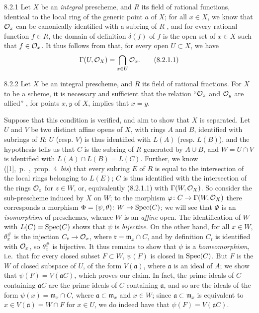\documentclass[../main.tex]{subfiles}
\begin{document}
\begin{env}{8.2.1}
    Let $X$ be an \emph{integral} prescheme, and $R$ its field of rational functions, identical to the local ring of the generic point $a$ of $X$; for all $x\in X$, we know that $\mathcal{O}_x$ can be canonically identified with a subring of $R$ , and for every rational function $f\in R$, the domain of definition $\delta(f)$ of $f$ is the open set of $x\in X$ such that $f\in\mathcal{O}_x$.
    It thus follows from  that, for every open $U\subset X$, we have
    \begin{equation*}
        \Gamma(U,\mathcal{O}_X) = \bigcap_{x\in U}\mathcal{O}_x.\tag{8.2.1.1}
    \end{equation*}
\end{env}

\begin{env}[Proposition]{8.2.2}
    Let $X$ be an integral prescheme, and $R$ its field of rational fractions.
    For $X$ to be a scheme, it is necessary and sufficient that the relation ``$\mathcal{O}_x$ and $\mathcal{O}_y$ are allied'' , for points $x,y$ of $X$, implies that $x=y$.
\end{env}

Suppose that this condition is verified, and aim to show that $X$ is separated.
Let $U$ and $V$ be two distinct affine opens of $X$, with rings $A$ and $B$, identified with subrings of $R$; $U$ (resp. $V$) is thus identified  with $L(A)$ (resp. $L(B)$), and the hypothesis tells us  that $C$ is the subring of $R$ generated by $A\cup B$, and $W=U\cap V$ is identified with $L(A)\cap L(B)=L(C)$.
Further, we know ([1],~p.~,~prop.~4~\emph{bis}) that every subring $E$ of $R$ is equal to the intersection of the local rings belonging to $L(E)$; $C$ is thus identified with the intersection of the rings $\mathcal{O}_z$ for $z\in W$, or, equivalently (8.2.1.1) with $\Gamma(W,\mathcal{O}_X)$.
So consider the sub-prescheme induced by $X$ on $W$; to the  morphism $\varphi\colon C\to\Gamma(W,\mathcal{O}_X)$ there corresponds  a morphism $\Phi=(\psi,\theta)\colon W\to\operatorname{Spec}(C)$; we will see that $\Phi$ is an \emph{isomorphism} of preschemes, whence $W$ is an \emph{affine} open.
The identification of $W$ with $L(C)=\operatorname{Spec}(C)$ shows that $\psi$ is \emph{bijective}.
On the other hand, for all $x\in W$, $\theta_x^\#$ is the injection $C_\mathfrak{r}\to\mathcal{O}_x$, where $\mathfrak{r}=\mathfrak{m}_x\cap C$, and by definition $C_\mathfrak{r}$ is identified with $\mathcal{O}_x$, so $\theta_x^\#$ is bijective.
It thus remains to show that $\psi$ is a \emph{homeomorphism}, i.e.\ that for every closed subset $F\subset W$, $\psi(F)$ is closed in $\operatorname{Spec}(C)$.
But $F$ is the  $W$ of closed subspace of $U$, of the form $V(\mathfrak{a})$, where $\mathfrak{a}$ is an ideal of $A$; we show that $\psi(F)=V(\mathfrak{a}C)$, which proves our claim.
In fact, the prime ideals of $C$ containing $\mathfrak{a}C$ are the prime ideals of $C$ containing $\mathfrak{a}$, and so are the ideals of the form $\psi(x)=\mathfrak{m}_x\cap C$, where $\mathfrak{a}\subset\mathfrak{m}_x$ and $x\in W$; since $\mathfrak{a}\subset\mathfrak{m}_x$ is equivalent to $x\in V(\mathfrak{a})=W\cap F$ for $x\in U$, we do indeed have that $\psi(F)=V(\mathfrak{a}C)$.
\end{document}
